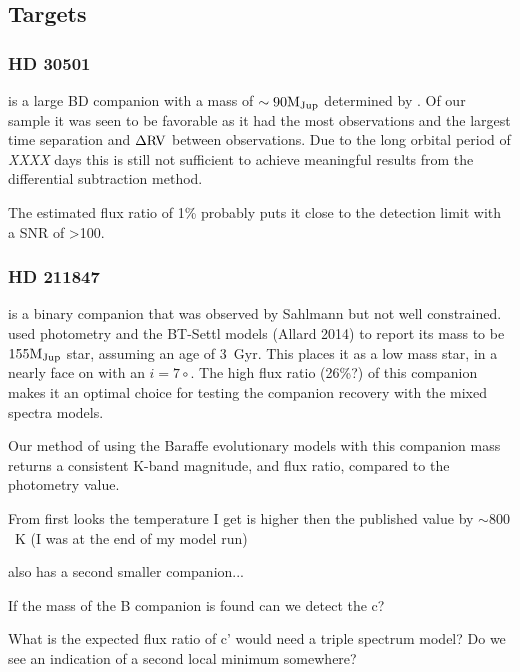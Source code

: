 

\subsection{Targets}
\label{subsec:targets}
\subsubsection{HD 30501}
\label{subsubsec:HD30501}
 is a large BD companion with a mass of \(\sim \rm 90 M_{Jup} \) determined by \citet{sahlmann_search_2011}. Of our sample it was seen to be favorable as it had the most observations and the largest time separation and \(\rm \Delta RV \) between observations. Due to the long orbital period of \emph{XXXX} days this is still not sufficient to achieve meaningful results from the differential subtraction method.

The estimated flux ratio of 1\% probably puts it close to the detection limit with a SNR of >100.


\subsubsection{HD 211847}
\label{subsubsec:HD211847}
 is a binary companion that was observed by Sahlmann but not well constrained. \citet{moutou_eccentricity_2017} used photometry and the BT-Settl models (Allard 2014) to report its mass to be \(\rm 155 M_{Jup} \) star, assuming an age of 3~Gyr. This places it as a low mass star, in a nearly face on with an \(i=7\circ \).
The high flux ratio (26\%?) of this companion makes it an optimal choice for testing the companion recovery with the mixed spectra models.

Our method of using the Baraffe evolutionary models with this companion mass returns a consistent K-band magnitude, and flux ratio, compared to the photometry value.

From first looks the temperature I get is higher then the published value by \(\sim800\)~K  (I was at the end of my model run)

 also has a second smaller companion...

If the mass of the B companion is found can we detect the c?

What is the expected flux ratio of c' would need a triple spectrum model? Do we see an indication of a second local minimum somewhere?
%


